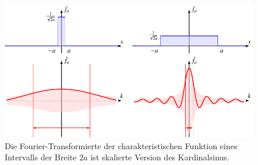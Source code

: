 %
%
%
\begin{figure}
\centering
\includegraphics{chapters/030-gruppen/images/sinc.pdf}
\caption{Die Fourier-Transformierte der charakteristischen Funktion
eines Intervalls der Breite $2a$ ist skalierte Version des
Kardinalsinus.
}
\end{figure}
